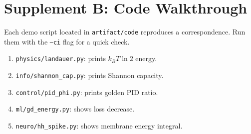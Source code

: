 \section*{Supplement B: Code Walkthrough}

Each demo script located in \texttt{artifact/code} reproduces a correspondence.
Run them with the \texttt{--ci} flag for a quick check.

\begin{enumerate}
  \item \texttt{physics/landauer.py}: prints $k_B T\ln 2$ energy.
  \item \texttt{info/shannon_cap.py}: prints Shannon capacity.
  \item \texttt{control/pid_phi.py}: prints golden PID ratio.
  \item \texttt{ml/gd_energy.py}: shows loss decrease.
  \item \texttt{neuro/hh_spike.py}: shows membrane energy integral.
\end{enumerate} 
